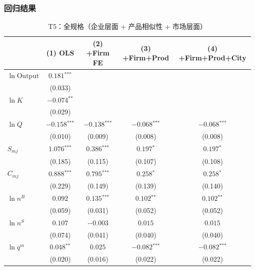 \documentclass[12pt]{article}
\newcommand{\sym}[1]{\ensuremath{^{\text{#1}}}}
\newcommand{\se}[1]{{\small(#1)}}
\newcommand{\abs}{\textemdash}
\begin{document}
\subsubsection*{回归结果}

\begin{table}[H]
  \centering
  \caption{T5：全规格（企业层面 + 产品相似性 + 市场层面）}
  \begin{threeparttable}
    \begin{tabular}{lcccc}
      \toprule
       & (1) OLS & (2) +Firm FE & (3) +Firm+Prod & (4) +Firm+Prod+City \\
      \midrule
      $\ln\mathrm{Output}$ & $0.181\sym{***}$ & \abs & \abs & \abs \\
                           & \se{0.033}       &     &     &     \\[4pt]
      $\ln K$              & $-0.074\sym{**}$ & \abs & \abs & \abs \\
                           & \se{0.029}        &     &     &     \\[4pt]
      $\ln Q$              & $-0.158\sym{***}$ & $-0.138\sym{***}$ & $-0.068\sym{***}$ & $-0.068\sym{***}$ \\
                           & \se{0.010}        & \se{0.009}        & \se{0.008}        & \se{0.008} \\[4pt]
      $S_{mj}$             & $1.076\sym{***}$ & $0.386\sym{***}$  & $0.197\sym{*}$  & $0.197\sym{*}$  \\
                           & \se{0.185}       & \se{0.115} & \se{0.107} & \se{0.108} \\[4pt]
      $C_{mj}$             & $0.888\sym{***}$  & $0.795\sym{***}$  & $0.258\sym{*}$ & $0.258\sym{*}$ \\
                           & \se{0.229} & \se{0.149} & \se{0.139} & \se{0.140} \\[4pt]
      $\ln n^B$            & $0.092$ & $0.135\sym{***}$ & $0.102\sym{**}$  & $0.102\sym{**}$  \\
                           & \se{0.059}       & \se{0.031}       & \se{0.052} & \se{0.052} \\[4pt]
      $\ln n^S$            & $0.107$  & $-0.003$  & $0.015$  & $0.015$  \\
                           & \se{0.074} & \se{0.041} & \se{0.040} & \se{0.040} \\[4pt]
      $\ln q^m$            & $0.048\sym{**}$ & $0.025$ & $-0.082\sym{***}$ & $-0.082\sym{***}$ \\
                           & \se{0.020}      & \se{0.016}       & \se{0.022}        & \se{0.022} \\[4pt]

\end{tabular}
\end{threeparttable}
\end{table}
\end{document}

